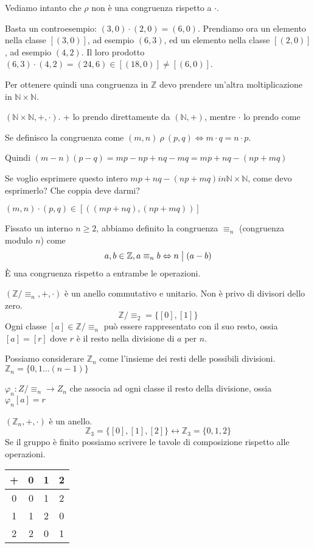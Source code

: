 Vediamo intanto che $\rho$ non \`e una congruenza rispetto a $\cdot$.

Basta un controesempio: $(3, 0) \cdot (2, 0) = (6, 0)$. Prendiamo ora un elemento nella classe $[(3,0)]$, ad esempio $(6,3)$, ed un elemento nella classe $[(2,0)]$, ad esempio $(4,2)$. Il loro prodotto $(6,3) \cdot (4,2) = (24,6) \in [(18,0)] \neq [(6,0)]$.

Per ottenere quindi una congruenza in $\mathbb{Z}$ devo prendere un'altra moltiplicazione in $\mathbb{N} \times \mathbb{N}$.

$(\mathbb{N} \times \mathbb{N}, +, \cdot)$. + lo prendo direttamente da $(\mathbb{N}, +)$, mentre $\cdot$ lo prendo come

Se definisco la congruenza come $(m, n) \ \rho \ (p, q) \Leftrightarrow m \cdot q = n \cdot p$.

Quindi $(m - n) (p - q) = m p - n p + n q - m q = m p + n q - ( n p + m q)$

Se voglio esprimere questo intero $m p + n q - ( n p + m q) in \mathbb{N} \times \mathbb{N}$, come devo esprimerlo? Che coppia deve darmi?

$(m, n) \cdot (p, q) \in [((m p + n q), (n p + m q))]$

Fissato un interno $n \ge 2$, abbiamo definito la congruenza $\equiv_n$ (congruenza modulo $n$) come
\[
a, b \in \mathbb{Z}, a \equiv_n b \Leftrightarrow n \bigm| (a - b)
\]
\`E una congruenza rispetto a entrambe le operazioni.

$(\mathbb{Z} / \equiv_n, +, \cdot)$ \`e un anello commutativo e unitario. Non \`e privo di divisori dello zero.
\[
\mathbb{Z} / \equiv_2 = \{ [0], [1] \}
\]
Ogni classe $[a] \in \mathbb{Z} / \equiv_n$ pu\`o essere rappresentato con il suo resto, ossia $[a] = [r]$ dove $r$ \`e il resto nella divisione di $a$ per $n$.

Possiamo considerare $\mathbb{Z}_n$ come l'insieme dei resti delle possibili divisioni. $\mathbb{Z}_n = \{ 0, 1 \dots (n-1)\}$

$\varphi_n : Z / \equiv_n \to Z_n$ che associa ad ogni classe il resto della divisione, ossia $\varphi_n [a] = r$

$(\mathbb{Z}_n, +, \cdot )$ \`e un anello.
\[
\mathbb{Z}_3 = \{ [0], [1], [2] \} \leftrightarrow \mathbb{Z}_3 = \{ 0, 1, 2 \}
\]
Se il gruppo \`e finito possiamo scrivere le tavole di composizione rispetto alle operazioni.

\begin{tabular}{c|ccc}
+ & 0 & 1 & 2 \\
\hline
0 & 0 & 1 & 2 \\
1 & 1 & 2 & 0 \\
2 & 2 & 0 & 1
\end{tabular}


